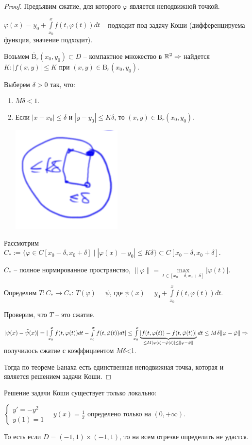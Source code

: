 \begin{proof} 
    Предъявим сжатие, для которого $\varphi$ является неподвижной точкой.
    
    $\varphi(x)=y_0 +\int\limits_{x_0}^x f(t, \varphi(t))dt$ – подходит под задачу Коши (дифференцируема функция, значение подходит).

    Возьмем $\overline{\text{B}}_r(x_0, y_0)\subset D$ – компактное множество в $\mathbb{R}^2\Rightarrow$ найдется $K: |f(x, y)|\leq K$ при $(x, y)\in \text{B}_r(x_0, y_0)$. 

    Выберем $\delta > 0$ так, что:
    \begin{enumerate}
        \item $M\delta < 1$.
        \item Если $|x - x_0|\leq \delta$ и $|y -y_0|\leq K\delta$, то $(x, y)\in \text{B}_r(x_0, y_0)$.

        \includegraphics[width=0.1\linewidth]{images/31-05-1.png}
    \end{enumerate}

    Рассмотрим $C_*:=\{\varphi\in C[x_0 - \delta, x_0 + \delta]\mid |\varphi(x) - y_0|\leq K\delta\}\subset C[x_0 - \delta, x_0 + \delta]$. 

    $C_*$ – полное нормированное пространство, $\|\varphi\|=\max\limits_{t\in [x_0 - \delta, x_0 + \delta]} |\varphi(t)|$.

    Определим $T: C_*\rightarrow C_*$: $T(\varphi)= \psi$, где $\psi(x) = y_0+\int\limits_{x_0}^x f(t, \varphi(t))dt$. 
    
    Проверим, что $T$ – это сжатие.

    $|\psi(x)-\Tilde{\psi}(x)|=|\int\limits_{x_0}^x f(t, \varphi(t))dt-\int\limits_{x_0}^x f(t, \Tilde{\varphi}(t))dt|\leq \int\limits_{x_0}^x \underbrace{|f(t, \varphi(t))- f(t, \Tilde{\varphi}(t))|}_{\leq M|\varphi(t)-\Tilde{\varphi}(t)|\leq \|\varphi-\Tilde{\varphi}\|}dt\leq M\delta\|\varphi-\Tilde{\varphi}\|\Rightarrow$ получилось сжатие с коэффициентом $M\delta$<1.

    Тогда по теореме Банаха есть единственная неподвижная точка, которая и является решением задачи Коши.
\end{proof}

\begin{remark}
    Решение задачи Коши существует только локально:

    $\left\{\begin{array}{l}
         y'=-y^2  \\
         y(1)=1
    \end{array}\right.\quad y(x)=\frac{1}{x}$ определено только на $(0, +\infty)$.

    То есть если $D=(-1, 1)\times(-1, 1)$, то на всем отрезке определить не удастся.
\end{remark}


